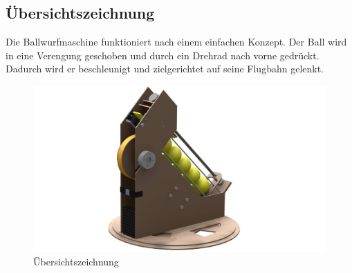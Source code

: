 \subsection{Übersichtszeichnung}
Die Ballwurfmaschine funktioniert nach einem einfachen Konzept. Der Ball wird in eine Verengung geschoben und durch ein Drehrad nach vorne gedrückt. Dadurch wird er beschleunigt und zielgerichtet auf seine Flugbahn gelenkt.
\begin{figure}[h!]
	\centering
	\includegraphics[width=\linewidth]{../../fig/Render_Komplettsystem}
	\caption{Übersichtszeichnung}
	\label{fig:Übersichtszeichnung}
\end{figure}